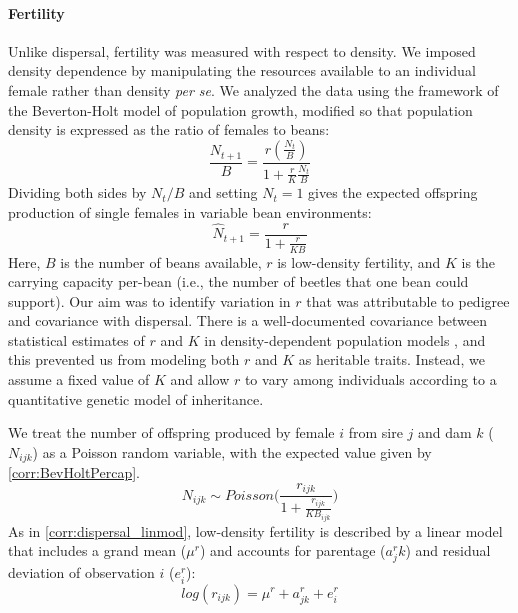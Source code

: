 \paragraph{Fertility}
Unlike dispersal, fertility was measured with respect to density. We imposed density dependence by manipulating the resources available to an individual female rather than density \textit{per se}. We analyzed the data using the framework of the Beverton-Holt model of population growth, modified so that population density is expressed as the ratio of females to beans:
%
\begin{equation}\label{corr:BevHoltFull}
  \frac{N_{t+1}}{B} = \frac{r(\frac{N_{t}}{B})}{1 + \frac{r}{K}\frac{N_{t}}{B}}
\end{equation}
%
Dividing both sides by $N_{t}/B$ and setting $N_{t}=1$ gives the expected offspring production of single females in variable bean environments:
%
\begin{equation}\label{corr:BevHoltPercap}
  \hat{N}_{t+1} = \frac{r}{1 + \frac{r}{KB}}
\end{equation}
%
Here, $B$ is the number of beans available, $r$ is low-density fertility, and $K$ is the carrying capacity per-bean (i.e., the number of beetles that one bean could support).  Our aim was to identify variation in $r$ that was attributable to pedigree and covariance with dispersal. There is a well-documented covariance between statistical estimates of $r$ and $K$ in density-dependent population models \citep{hilborn_quantitative_1992}, and this prevented us from modeling both $r$ and $K$ as heritable traits. Instead, we assume a fixed value of $K$ and allow $r$ to vary among individuals according to a quantitative genetic model of inheritance. 

We treat the number of offspring produced by female $i$ from sire $j$ and dam $k$ ($N_{ijk}$) as a Poisson random variable, with the expected value given by \ref{corr:BevHoltPercap}.
%
\begin{equation}\label{corr:Noff_ran}
  N_{ijk} \sim \mathit{Poisson}\Big(\frac{r_{ijk}} {1 + \frac{r_{ijk}}{KB_{ijk} }}\Big)
\end{equation}
%
As in \ref{corr:dispersal_linmod}, low-density fertility is described by a linear model that includes a grand mean ($\mu^{r}$) and accounts for parentage ($a^{r}_jk$) and residual deviation of observation $i$ ($e^{r}_i$):
%
\begin{equation} \label{corr:fert_linmod}
  log(r_{ijk}) = \mu^{r} + a^{r}_{jk} + e^{r}_{i}
\end{equation}
%

